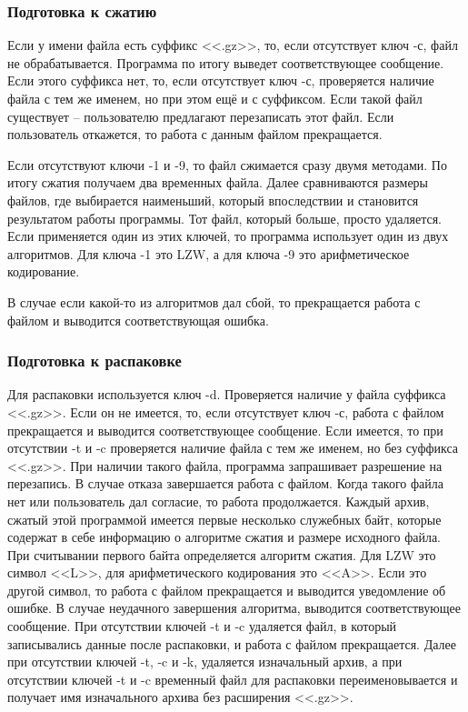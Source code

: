 \documentclass[12pt]{article}
\begin{document}
\subsubsection*{Подготовка к сжатию}

Если у имени файла есть суффикс <<.gz>>, то, если отсутствует ключ -с, файл не обрабатывается. Программа по итогу выведет соответствующее сообщение. Если этого суффикса нет, то, если отсутствует ключ -с, проверяется наличие файла с тем же именем, но при этом ещё и с суффиксом. Если такой файл существует -- пользователю предлагают перезаписать этот файл. Если пользователь откажется, то работа с данным файлом прекращается.

Если отсутствуют ключи -1 и -9, то файл сжимается сразу двумя методами. По итогу сжатия получаем два временных файла. Далее сравниваются размеры файлов, где выбирается наименьший, который впоследствии и становится результатом работы программы. Тот файл, который больше, просто удаляется. Если применяется один из этих ключей, то программа использует один из двух алгоритмов. Для ключа -1 это LZW, а для ключа -9 это арифметическое кодирование.

В случае если какой-то из алгоритмов дал сбой, то прекращается работа с файлом и выводится соответствующая ошибка.

\subsubsection*{Подготовка к распаковке}

Для распаковки используется ключ -d. Проверяется наличие у файла суффикса <<.gz>>. Если он не имеется, то, если отсутствует ключ -с, работа с файлом прекращается и выводится соответствующее сообщение. Если имеется, то при отсутствии -t и -c проверяется наличие файла с тем же именем, но без суффикса <<.gz>>. При наличии такого файла, программа запрашивает разрешение на перезапись. В случае отказа завершается работа с файлом. Когда такого файла нет или пользователь дал согласие, то работа продолжается. Каждый архив, сжатый этой программой имеется первые несколько служебных байт, которые содержат в себе информацию о алгоритме сжатия и размере исходного файла. При считывании первого байта определяется алгоритм сжатия. Для LZW это символ <<L>>, для арифметического кодирования это <<A>>. Если это другой символ, то работа с файлом прекращается и выводится уведомление об ошибке. В случае неудачного завершения алгоритма, выводится соответствующее сообщение. При отсутствии ключей -t и -c удаляется файл, в который записывались данные после распаковки, и работа с файлом прекращается. Далее при отсутствии ключей -t, -c и -k, удаляется изначальный архив, а при отсутствии ключей -t и -c временный файл для распаковки переименовывается и получает имя изначального архива без расширения <<.gz>>.
\end{document}

